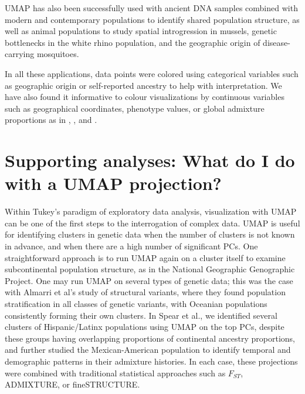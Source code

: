\documentclass[12pt]{article}
\begin{document}
UMAP has also been successfully used with ancient DNA samples combined with modern and contemporary populations to identify shared population structure\cite{margaryan_population_2019}, as well as animal populations to study spatial introgression in mussels\cite{simon_local_2019}, genetic bottlenecks in the white rhino population\cite{sanchez-barreiro_historical_2020}, and the geographic origin of disease-carrying mosquitoes\cite{consortium_genome_2020}\cite{schmidt2020population}. 

In all these applications, data points were colored using categorical variables such as geographic origin or self-reported ancestry to help with interpretation. We have also found it informative to colour visualizations by continuous variables such as geographical coordinates, phenotype values, or global admixture proportions as in \cite{diaz-papkovich_umap_2019}, \cite{dai_population_2020}, and \cite{spear2020recent}.

\section*{Supporting analyses: What do I do with a UMAP projection?}
Within Tukey's paradigm of exploratory data analysis, visualization with UMAP can be one of the first steps to the interrogation of complex data\cite{holmes2018modern}. UMAP is useful for identifying clusters in genetic data when the number of clusters is not known in advance\cite{tonkin-hill_fast_2019}, and when there are a high number of significant PCs\cite{diaz-papkovich_umap_2019}. One straightforward approach is to run UMAP again on a cluster itself to examine subcontinental population structure, as in the National Geographic Genographic Project\cite{dai_population_2020}. One may run UMAP on several types of genetic data; this was the case with Almarri et al's study of structural variants, where they found population stratification in all classes of genetic variants, with Oceanian populations consistently forming their own clusters\cite{almarri2020population}. In Spear et al., we identified several clusters of Hispanic/Latinx populations using UMAP on the top PCs, despite these groups having overlapping proportions of continental ancestry proportions, and further studied the Mexican-American population to identify temporal and demographic patterns in their admixture histories\cite{spear2020recent}. In each case, these projections were combined with traditional statistical approaches such as $F_{ST}$, ADMIXTURE\cite{alexander2009fast}, or fineSTRUCTURE\cite{lawson2012inference}.
\end{document}
